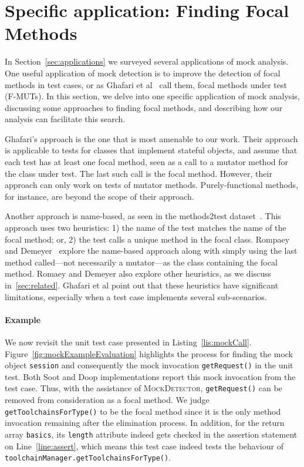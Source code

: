 \section{Specific application: Finding Focal Methods}
\label{sec:focal}

In Section~\ref{sec:applications} we surveyed several applications of mock analysis.
One useful application of mock detection is to
improve the detection of focal methods in test cases, or as Ghafari et
al~\cite{ghafari15:_autom} call them, focal methods under test
(F-MUTs). In this section, we delve into one specific application of mock analysis, 
discussing some approaches to finding
focal methods, and describing how our analysis can facilitate this search.

Ghafari's approach is the one that is most amenable to our work.
Their approach is applicable to tests for classes that implement
stateful objects, and assume that each test has at least one focal
method, seen as a call to a mutator method for the class under test.
The last such call is the focal method. However, their approach can
only work on tests of mutator methods.  Purely-functional methods, for
instance, are beyond the scope of their approach.

Another approach is name-based, as seen in the methods2test
dataset~\cite{tufano2020unit}.  This approach uses two heuristics: 1)
the name of the test matches the name of the focal method; or, 2) the
test calls a unique method in the focal class. Rompaey and
Demeyer~\cite{rompaey09:_estab_traceab_links_unit_test} explore the
name-based approach along with simply using the last method called---not necessarily a mutator---as the class containing the focal method.  Romaey and Demeyer also
explore other heuristics, as we discuss in~\ref{sec:related}. Ghafari et al point out
that these heuristics have significant limitations, especially when a
test case implements several sub-scenarios.


\paragraph{Example} We now revisit the unit test case presented in Listing~\ref{lis:mockCall}. Figure~\ref{fig:mockExampleEvaluation} highlights the process for finding the mock object \texttt{session} and consequently the mock invocation \texttt{getRequest()} in the unit test. Both Soot and Doop implementations report this mock invocation 
from the test case. Thus, with the assistance of \textsc{MockDetector}, \texttt{getRequest()} can be removed from consideration as a focal method. We judge \texttt{getToolchainsForType()} to be the focal method since it is the only method invocation remaining after the elimination process. In addition, for the return array \texttt{basics}, its \texttt{length} attribute indeed gets checked in the assertion statement on Line~\ref{line:assert}, which means this test case indeed tests the behaviour of \texttt{toolchainManager.getToolchainsForType()}. 

